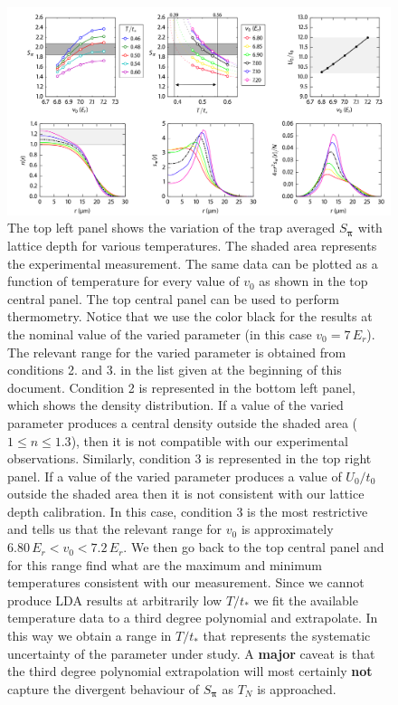 \documentclass[11pt,letter]{article}
\newcommand{\bv}[1]{\ensuremath{\bm{#1}}}
\begin{document}
\begin{figure}[H]
    \centering \includegraphics[width=\textwidth]{figures/01_LatticeDepth.png}
\caption{ The top left panel shows the variation of the trap averaged
$S_{\bv{\pi}}$ with lattice depth for various temperatures.   The shaded area
represents the experimental measurement.  The same data can be plotted as a
function of temperature for every value of $v_{0}$ as shown in the top central
panel.  The top central panel can be used to perform thermometry.  Notice that
we use the color black for the results at the nominal value of the varied
parameter (in this case $v_{0}=7\,E_{r}$).   The relevant range for the varied
parameter is obtained from conditions 2. and 3. in the list given at the
beginning of this document.   Condition 2 is represented in the bottom left
panel, which shows the density distribution.  If a value of the varied
parameter produces a central density outside the shaded area ($1\leq n
\leq1.3$), then it is not compatible with our experimental observations.
Similarly, condition 3 is represented in the top right panel.  If a value of
the varied parameter produces a value of $U_{0}/t_{0}$ outside the shaded area
then it is not consistent with our lattice depth calibration.   In this case,
condition 3 is the most restrictive and tells us that the relevant range for
$v_{0}$ is approximately $6.80\,E_{r} < v_{0} < 7.2\,E_{r}$.   We then go back
to the top central panel and for this range find what are the maximum and
minimum temperatures consistent with our measurement.   Since we cannot produce
LDA results at arbitrarily low $T/t_{*}$  we fit the available temperature data
to a third degree polynomial and extrapolate.   In this way we obtain a range
in $T/t_{*}$ that represents the systematic uncertainty of the parameter under
study.   A \textbf{major} caveat is that the third degree polynomial
extrapolation will most certainly \textbf{not} capture the divergent behaviour
of $S_{\bv{\pi}}$ as $T_{N}$ is approached. } 
\label{fig:01}
\end{figure}
\end{document}
